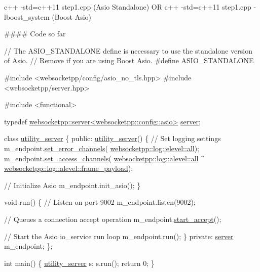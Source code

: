 {\ttfamily c++ -\/std=c++11 step1.\+cpp} (Asio Standalone) OR {\ttfamily c++ -\/std=c++11 step1.\+cpp -\/lboost\+\_\+system} (Boost Asio)

\#\#\#\# Code so far 
\begin{DoxyCode}
\textcolor{comment}{// The ASIO\_STANDALONE define is necessary to use the standalone version of Asio.}
\textcolor{comment}{// Remove if you are using Boost Asio.}
\textcolor{preprocessor}{#define ASIO\_STANDALONE}

\textcolor{preprocessor}{#include <websocketpp/config/asio\_no\_tls.hpp>}
\textcolor{preprocessor}{#include <websocketpp/server.hpp>}

\textcolor{preprocessor}{#include <functional>}

\textcolor{keyword}{typedef} \mbox{\hyperlink{classwebsocketpp_1_1server}{websocketpp::server<websocketpp::config::asio>}} 
      \mbox{\hyperlink{classwebsocketpp_1_1server}{server}};

\textcolor{keyword}{class }\mbox{\hyperlink{classutility__server}{utility\_server}} \{
\textcolor{keyword}{public}:
    \mbox{\hyperlink{classutility__server}{utility\_server}}() \{
         \textcolor{comment}{// Set logging settings}
        m\_endpoint.\mbox{\hyperlink{classwebsocketpp_1_1endpoint_a8292bcdca9344b57af1b0964ff7fc778}{set\_error\_channels}}(
      \mbox{\hyperlink{structwebsocketpp_1_1log_1_1elevel_a9b31ff708c221d314f9f4eb3ff2b1ad7}{websocketpp::log::elevel::all}});
        m\_endpoint.\mbox{\hyperlink{classwebsocketpp_1_1endpoint_a5d7da609ebd2f797e5e67b6d050ebc59}{set\_access\_channels}}(
      \mbox{\hyperlink{structwebsocketpp_1_1log_1_1alevel_a853aa0b8976e53f3181af3bc398d493e}{websocketpp::log::alevel::all}} ^ 
      \mbox{\hyperlink{structwebsocketpp_1_1log_1_1alevel_aa38cfdf7a82f33cac319438462707e90}{websocketpp::log::alevel::frame\_payload}});

        \textcolor{comment}{// Initialize Asio}
        m\_endpoint.init\_asio();
    \}

    \textcolor{keywordtype}{void} run() \{
        \textcolor{comment}{// Listen on port 9002}
        m\_endpoint.listen(9002);

        \textcolor{comment}{// Queues a connection accept operation}
        m\_endpoint.\mbox{\hyperlink{classwebsocketpp_1_1server_a0204a7d444144f7ea5b8bbcf14689fc1}{start\_accept}}();

        \textcolor{comment}{// Start the Asio io\_service run loop}
        m\_endpoint.run();
    \}
\textcolor{keyword}{private}:
    \mbox{\hyperlink{classwebsocketpp_1_1server}{server}} m\_endpoint;
\};

\textcolor{keywordtype}{int} main() \{
    \mbox{\hyperlink{classutility__server}{utility\_server}} s;
    s.run();
    \textcolor{keywordflow}{return} 0;
\}
\end{DoxyCode}


